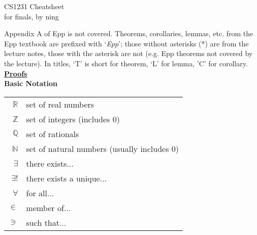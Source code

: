 \documentclass[a4paper]{article}
\newcommand{\heading}[1]{{\small\underline{\textbf{#1}}}}
\newcommand{\subheading}[1]{{\scriptsize\textbf{#1}}}
\begin{document}
\scriptsize                         %
\setlength\parindent{0pt}           %
\setlength{\abovedisplayskip}{3pt}  %
\setlength{\belowdisplayskip}{3pt}  %

\begin{center}
  {\large CS1231 Cheatsheet}\\{for finals, by ning}
\end{center}

\begin{multicols*}{4}

Appendix A of Epp is not covered. Theorems, corollaries, lemmas, etc. from the
Epp textbook are prefixed with `\textit{Epp}'; those without asterisks (*) are
from the lecture notes, those with the asterisk are not (e.g. Epp theorems not
covered by the lecture). In titles, `T' is short for theorem, `L' for lemma, 'C'
for corollary.\\

\heading{Proofs} \\

\subheading{Basic Notation}\\

\begin{tabularx}{\columnwidth}{rX}
  $\mathbb{R}$ & set of real numbers \\
  $\mathbb{Z}$ & set of integers (includes $0$) \\
  $\mathbb{Q}$ & set of rationals \\
  $\mathbb{N}$ & set of natural numbers (usually includes $0$) \\
  $\exists$    & there exists... \\
  $\exists!$   & there exists a unique... \\
  $\forall$    & for all... \\
  $\in$        & member of... \\
  $\ni$        & such that... \\
\end{tabularx}\\


\end{multicols*}
\end{document}
